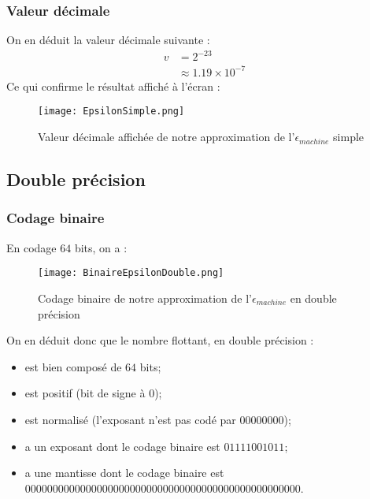 \documentclass[a4paper, titlepage]{livret} %
\begin{document}
				\subsubsection{Valeur décimale}
					On en déduit la valeur décimale suivante :
					\[\begin{aligned}
						v & = 2^{-23}\\
						  & \approx 1.19 \times 10^{-7}
					\end{aligned}\]
					Ce qui confirme le résultat affiché à l'écran :
					\begin{figure}[!h]
						\centering
  							\texttt{[image: EpsilonSimple.png]}
  							\caption{Valeur décimale affichée de notre approximation de l'$\epsilon_{machine}$ simple}
					\end{figure}

			\subsection{Double précision}
				\subsubsection{Codage binaire}
					En codage $64$ bits, on a :
					\begin{figure}[!h]
						\centering
  							\texttt{[image: BinaireEpsilonDouble.png]}
  							\caption{Codage binaire de notre approximation de l'$\epsilon_{machine}$ en double précision}
					\end{figure}
	
					On en déduit donc que le nombre flottant, en double précision :
					\begin{itemize}
						\item est bien composé de $64$ bits;
						\item est positif (bit de signe à 0);
						\item est normalisé (l'exposant n'est pas codé par $00000000$);
						\item a un exposant dont le codage binaire est $01111001011$;
						\item a une mantisse dont le codage binaire est $00000000 00000000 0000000 0000000 00000000 00000000 0000$.
					\end{itemize}
\end{document}
